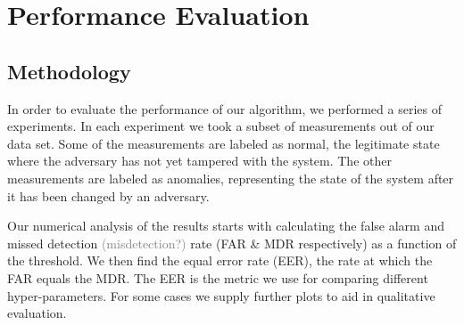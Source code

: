 \documentclass[conference]{IEEEtran}
\begin{document}
  \begin{table}
    \caption{Number of Features per Segment Type}
    \label{tab:feature_set_sizes}
    \centering
  \end{table}
  
 
\section{Performance Evaluation}

\subsection{Methodology}
  In order to evaluate the performance of our algorithm, we performed a series of experiments. In each experiment we took a subset of measurements out of our data set. Some of the measurements are labeled as normal, the legitimate state where the adversary has not yet tampered with the system. The other measurements are labeled as anomalies, representing the state of the system after it has been changed by an adversary.
  
  Our numerical analysis of the results starts with calculating the false alarm and missed detection \textcolor{gray}{(misdetection?)} rate (FAR \& MDR respectively) as a function of the threshold. We then find the equal error rate (EER), the rate at which the FAR equals the MDR. The EER is the metric we use for comparing different hyper-parameters. For some cases we supply further plots to aid in qualitative evaluation.
  
\end{document}
